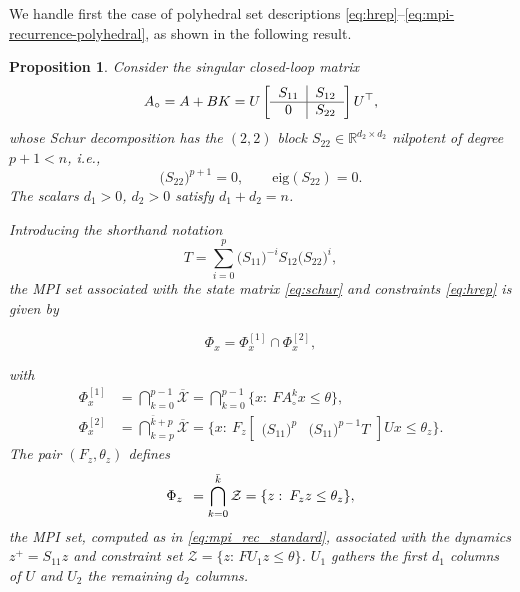 \documentclass[journal,twoside,web]{ieeecolor}
\newcommand{\bbm}{\begin{bmatrix}}
\newcommand{\ebm}{\end{bmatrix}}
\newtheorem{prop}{Proposition}
\newcommand{\bbm}{\begin{bmatrix}}
\newcommand{\ebm}{\end{bmatrix}}
\newtheorem{prop}{Proposition}
\begin{document}
We handle first the case of polyhedral set descriptions \eqref{eq:hrep}--\eqref{eq:mpi-recurrence-polyhedral}, as shown in the following result.

\begin{prop}
\label{prop:p}
Consider the singular closed-loop matrix 
\begin{equation}
\label{eq:schur}
    A_\circ=A+BK = U\left[\begin{tabular}{c|c}
         $S_{11}$& $S_{12}$ \\\hline
         0& $S_{22}$
    \end{tabular}\right]U^\top, 
\end{equation}
whose Schur decomposition has the $(2,2)$ block $S_{22}\in \mathbb{R}^{d_2\times d_2}$ nilpotent of degree $p+1<n$, i.e.,
\begin{equation}
\label{eq:nilpotent}
    \bigl(S_{22}\bigr)^{p+1} = 0, \qquad \text{eig}(S_{22}) = 0.
\end{equation}
The scalars $d_1>0$, $d_2>0$ satisfy $d_1+d_2=n$.

Introducing the shorthand notation
\begin{equation}
    \label{eq:T}
    T=\sum_{i=0}^{p} \bigl(S_{11}\bigr)^{-i}S_{12}\bigl(S_{22}\bigr)^{i},
\end{equation}
the MPI set associated with the state matrix \eqref{eq:schur} and constraints \eqref{eq:hrep} is given by

\begin{equation}
    \label{eq:mpi-schur}
    \Phi_x = \Phi^{[1]}_x \cap \Phi^{[2]}_x, 
\end{equation}


\noindent with
\begin{align}
    \label{eq:mpi-schur_1}
    \Phi_x^{[1]} &= \bigcap\limits_{k=0}^{p-1} \overline{\mathcal X}=\bigcap\limits_{k=0}^{p-1}\biggl\{x:\:FA_\circ^k x\leq \theta\biggr\}, \\
    \label{eq:mpi-schur_2}
    \Phi_x^{[2]} &=\bigcap\limits_{k=p}^{\bar k +p}\overline{\mathcal X}= \biggl\{x:\: F_z \bbm \bigl(S_{11}\bigr)^p &\bigl(S_{11}\bigr)^{p-1}T\ebm U x\leq \theta_z\biggr\}.
    \end{align}
The pair $(F_z, \theta_z)$ defines 
\begin{equation}
        \label{eq:mpi_z}
    \Phi_z\hphantom{^{1}} =\bigcap\limits_{k=0}^{\bar k}\mathcal Z=\{z:\: F_zz\leq \theta_z\},
\end{equation}
the MPI set, computed as in \eqref{eq:mpi_rec_standard}, associated with the dynamics $z^+=S_{11}z$ and constraint set $\mathcal{Z}=\{z:\,F U_1 z\leq\theta\}$. $U_1$ gathers the first $d_1$ columns of $U$ and $U_2$ the remaining $d_2$ columns.
\end{prop}
\end{document}
